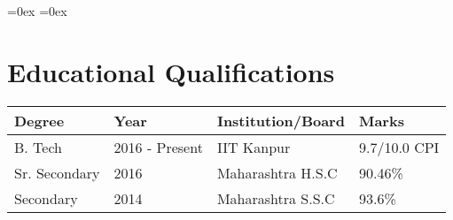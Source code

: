 \setlength\extrarowheight{3pt}  %
\aboverulesep=0ex  %
\belowrulesep=0ex  %

\section*{Educational Qualifications}
\begin{tabularx}{\textwidth}{|L|L|L|L|}

\toprule
\textbf{Degree} & \textbf{Year}  & \textbf{Institution/Board} & \textbf{Marks}\\
\midrule
B. Tech         & 2016 - Present & IIT Kanpur                 & 9.7/10.0 CPI\\
Sr. Secondary   & 2016           & Maharashtra H.S.C          & 90.46\%\\
Secondary       & 2014           & Maharashtra S.S.C          & 93.6\%\\
\bottomrule

\end{tabularx}
